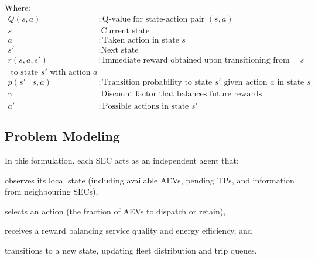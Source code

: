 Where:
\begin{align*}
Q(s, a) & : \text{Q-value for state-action pair }(s, a) \\
s & : \text{Current state} \\
a & : \text{Taken action in state } s \\
s' & : \text{Next state} \\
r(s, a, s') & : \text{Immediate reward obtained upon transitioning from state }  s\\ \text{ to state } s' \text{ with action } a \\
p(s' \mid s, a) & : \text{Transition probability to state } s' \text{ given action } a \text{ in state } s \\
\gamma & : \text{Discount factor that balances future rewards} \\
a' & : \text{Possible actions in state } s'
\end{align*}



\subsection{Problem Modeling}
In this formulation, each SEC acts as an independent agent that:

\begin{enumerate*}[label=(\roman*)]
    \item observes its local state (including available AEVs, pending TPs, and information from neighbouring SECs),
    \item selects an action (the fraction of AEVs to dispatch or retain),
    \item receives a reward balancing service quality and energy efficiency, and
    \item transitions to a new state, updating fleet distribution and trip queues.
\end{enumerate*}

